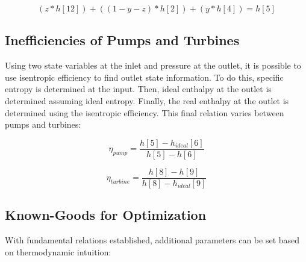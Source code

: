 \documentclass[10pt,cleanfoot]{asme2ej}
\begin{document}
\begin{equation}
(z * h[12]) + ((1-y-z) * h[2]) + (y * h[4]) = h[5]
\label{O.F.H. enthalpies}
\end{equation}

\subsection{Inefficiencies of Pumps and Turbines}

Using two state variables at the inlet and pressure at the outlet, it is possible to use isentropic efficiency to find outlet state information. To do this, specific entropy is determined at the input. Then, ideal enthalpy at the outlet is determined assuming ideal entropy. Finally, the real enthalpy at the outlet is determined using the isentropic efficiency. This final relation varies between pumps and turbines:

\begin{equation}
\eta_{pump} = \frac{h[5] - h_{ideal}[6]}{h[5] - h[6]}
\label{Pump entropy}
\end{equation}

\begin{equation}
\eta_{turbine} = \frac{h[8] - h[9]}{h[8] - h_{ideal}[9]}
\label{Turbine entropy}
\end{equation}

\subsection{Known-Goods for Optimization}

With fundamental relations established, additional parameters can be set based on thermodynamic intuition:
\end{document}
